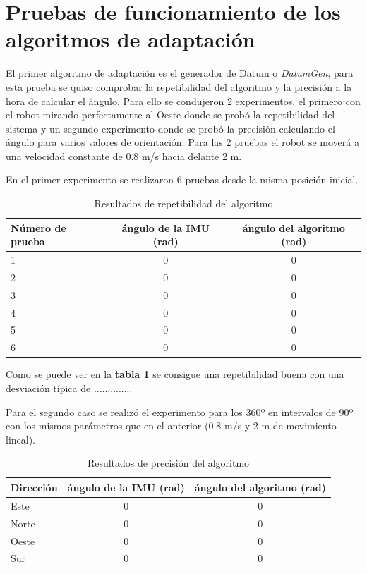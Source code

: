 \section{Pruebas de funcionamiento de los algoritmos de adaptación}
El primer algoritmo de adaptación es el generador de Datum o \textit{DatumGen}, para esta prueba se quiso comprobar la repetibilidad del algoritmo y 
la precisión a la hora de calcular el ángulo. Para ello se condujeron 2 experimentos, el primero con el robot mirando perfectamente al Oeste donde se probó la 
repetibilidad del sistema y un segundo experimento donde se probó la precisión calculando el ángulo para varios valores de orientación. Para las 2 pruebas 
el robot se moverá a una velocidad constante de 0.8 m/s hacia delante 2 m.

En el primer experimento se realizaron 6 pruebas desde la misma posición inicial.
\begin{table}[H]
    \centering
    \caption{Resultados de repetibilidad del algoritmo}
    \begin{tabular}{|l|c|c|}
        \hline
        Número de prueba     & ángulo de la IMU (rad) & ángulo del algoritmo (rad)     \\ \hline
        1           & 0 & 0 \\ \hline
        2           & 0 & 0  \\ \hline
        3           & 0 & 0  \\ \hline
        4           & 0 & 0  \\ \hline
        5           & 0 & 0  \\ \hline
        6            & 0 & 0  \\ \hline
    \end{tabular}
    \label{tab:repetibilidad_datumgen}
\end{table}

Como se puede ver en la \textbf{tabla \ref{tab:repetibilidad_datumgen}} se consigue una repetibilidad buena con una desviación 
típica de ..............

Para el segundo caso se realizó el experimento para los 360º en intervalos de 90º con los mismos parámetros que en el anterior (0.8 m/s y 2 m de movimiento lineal).

\begin{table}[H]
    \centering
    \caption{Resultados de precisión del algoritmo}
    \begin{tabular}{|l|c|c|}
        \hline
        Dirección     & ángulo de la IMU (rad) & ángulo del algoritmo (rad)     \\ \hline
        Este           & 0 & 0 \\ \hline
        Norte           & 0 & 0  \\ \hline
        Oeste           & 0 & 0  \\ \hline
        Sur           & 0 & 0 \\ \hline
    \end{tabular}
    \label{tab:precisión_datumgen}
\end{table}


